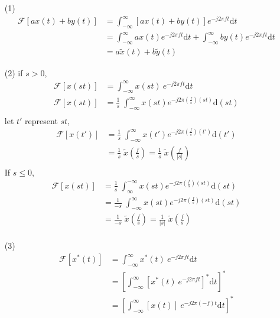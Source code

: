 \documentclass{article}
\begin{document}
\begin{enumerate}
    \item[(1)]
    \begin{align*}
        \mathcal{F}[ax(t) + by(t)]&= \int_{- \infty}^{\infty} [ax(t) + by(t)] e^{-j2\pi f t} \mathrm{d}t \\
        &= \int_{- \infty}^{\infty} ax(t) e^{-j2\pi f t} \mathrm{d}t + \int_{- \infty}^{\infty} by(t) e^{-j2\pi f t} \mathrm{d}t\\
        &= a \widetilde{x}(t) + b \widetilde{y}(t)
    \end{align*}
    \item[(2)]
    if $s > 0$,
    \begin{align*}
        \mathcal{F}[x(st)] &= \int_{- \infty}^{\infty} x(st) ~ e^{-j2\pi f t} \mathrm{d}t\\
        \mathcal{F}[x(st)] &= \frac{1}{s} \; \int_{- \infty}^{\infty} x(st) e^{-j2\pi (\frac{f}{s}) (st)} \mathrm{d}(st)\\
    \end{align*}
    let $t'$ represent $st$,
    \begin{align*}
        \mathcal{F}[x(t')] &= \frac{1}{s} \; \int_{- \infty}^{\infty} x(t') e^{-j2\pi (\frac{f}{s}) (t')} \mathrm{d}(t')\\
        &= \frac{1}{s} \; \widetilde{x} (\frac{f}{s}) =  \frac{1}{s} \; \widetilde{x} (\frac{f}{|s|})\\
    \end{align*}
    If $s \leq 0$,
    \begin{align*}
        \mathcal{F}[x(st)] &= \frac{1}{s} \; \int_{\infty}^{- \infty} x(st) e^{-j2\pi (\frac{f}{s}) (st)} \mathrm{d}(st)\\
        &= \frac{1}{-s} \; \int_{- \infty}^{\infty} x(st) e^{-j2\pi (\frac{f}{s}) (st)} \mathrm{d}(st)\\
        &= \frac{1}{-s} \; \widetilde{x} (\frac{f}{s}) = \frac{1}{|s|} \; \widetilde{x} (\frac{f}{s})\\
    \end{align*}
    \item[(3)]
    \begin{align*}
        \mathcal{F}[x^*(t)] &= \int_{- \infty}^{\infty} x^*(t) ~ e^{-j2\pi f t} \mathrm{d}t\\
        &= \left[ \int_{- \infty}^{\infty} [x^*(t) ~ e^{-j2\pi f t}]^* \mathrm{d}t \right]^*\\
        &= \left[ \int_{- \infty}^{\infty} [x(t)] ~ e^{-j2\pi (-f) t} \mathrm{d}t \right]^*\\

\end{align*}
\end{enumerate}
\end{document}
